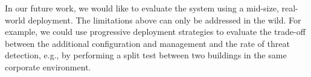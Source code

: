 In our future work, we would like to evaluate the system using a
mid-size, real-world deployment.  The limitations above can only be
addressed in the wild.  For example, we could use progressive
deployment strategies to evaluate the trade-off between the additional
configuration and management and the rate of threat detection, e.g.,
by performing a split test between two buildings in the same corporate
environment.
